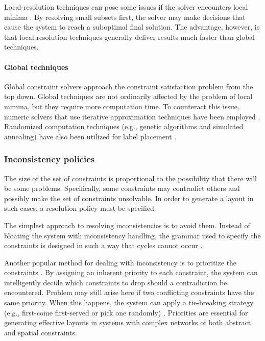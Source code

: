       Local-resolution techniques can pose some issues if the solver encounters
      local minima \citep{borning-2}. By resolving small subsets first, the
      solver may make decisions that cause the system to reach a suboptimal
      final solution. The advantage, however, is that local-resolution
      techniques generally deliver results much faster than global techniques.

     \paragraph{Global techniques}

      Global constraint solvers approach the constraint satisfaction problem
      from the top down. Global techniques are not ordinarily affected by the
      problem of local minima, but they require more computation time. To
      counteract this issue, numeric solvers that use iterative approximation
      techniques have been employed \citep{kurlander-1}. Randomized computation
      techniques (e.g., genetic algorithms and simulated annealing) have also
      been utilized for label placement \citep{christensen-2}.

    \subsubsection{Inconsistency policies}

     The size of the set of constraints is proportional to the possibility that
     there will be some problems. Specifically, some constraints may contradict
     others and possibly make the set of constraints unsolvable. In order to
     generate a layout in such cases, a resolution policy must be specified.

     The simplest approach to resolving inconsistencies is to avoid them.
     Instead of bloating the system with inconsistency handling, the grammar
     used to specify the constraints is designed in such a way that cycles
     cannot occur \citep{weitzman-2}.

     Another popular method for dealing with inconsistency is to prioritize the
     constraints \citep{graf-1}. By assigning an inherent priority to each
     constraint, the system can intelligently decide which constraints to drop
     should a contradiction be encountered. Problem may still arise here if two
     conflicting constraints have the same priority. When this happens, the
     system can apply a tie-breaking strategy (e.g., first-come first-served or
     pick one randomly) \citep{nilsson-1}. Priorities are essential for
     generating effective layouts in systems with complex networks of both
     abstract and spatial constraints.

